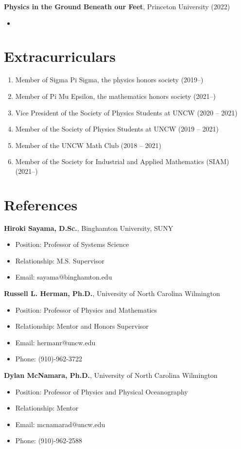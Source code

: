 \documentclass[12pt]{article}
\begin{document}
\textbf{Physics in the Ground Beneath our Feet}, Princeton University \hfill (2022)
\begin{itemize}
    \itemsep = 0em
    \item
\end{itemize}


\section{Extracurriculars}
\begin{enumerate}
    \itemsep = 0em
    \item Member of Sigma Pi Sigma, the physics honors society \hfill (2019--)
    \item Member of Pi Mu Epsilon, the mathematics honors society \hfill (2021--)
    \item Vice President of the Society of Physics Students at UNCW \hfill (2020 -- 2021)
    \item Member of the Society of Physics Students at UNCW \hfill (2019 -- 2021)
    \item Member of the UNCW Math Club \hfill (2018 -- 2021)
    \item Member of the Society for Industrial and Applied Mathematics (SIAM) \hfill (2021--)
\end{enumerate}

\section{References}
\textbf{Hiroki Sayama, D.Sc.}, Binghamton University, SUNY
\begin{itemize}
    \itemsep = 0em
    \item[] Position: Professor of Systems Science
    \item[] Relationship: M.S. Supervisor
    \item[] Email: sayama@binghamton.edu
\end{itemize}

\textbf{Russell L. Herman, Ph.D.}, University of North Carolina Wilmington
\begin{itemize}
    \itemsep = 0em
    \item[] Position: Professor of Physics and Mathematics
    \item[] Relationship: Mentor and Honors Supervisor
    \item[] Email: hermanr@uncw.edu
    \item[] Phone: (910)-962-3722
\end{itemize}

\textbf{Dylan McNamara, Ph.D.}, University of North Carolina Wilmington
\begin{itemize}
    \itemsep = 0em
    \item[] Position: Professor of Physics and Physical Oceanography
    \item[] Relationship: Mentor
    \item[] Email: mcnamarad@uncw.edu
    \item[] Phone: (910)-962-2588
\end{itemize}
\end{document}
